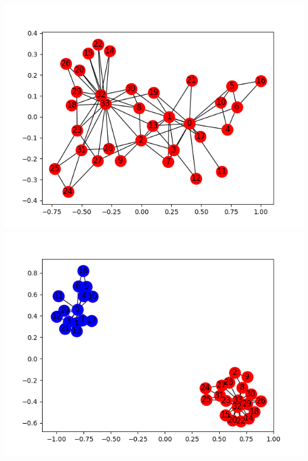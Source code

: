 \documentclass[11pt]{report}
\begin{document}
\includegraphics[scale=0.5]{graph01.png}
\includegraphics[scale=0.5]{final.png}
\end{document}
